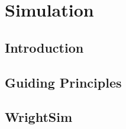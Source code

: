 \chapter{Simulation} \label{cha:sim}

\clearpage

\section{Introduction}  %

\clearpage

\section{Guiding Principles}  %

\section{WrightSim}  %

\clearpage
